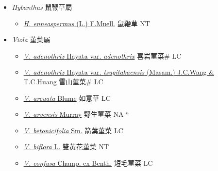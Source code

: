 
  \begin{itemize}
 \item[] \textit{Hybanthus} 鼠鞭草屬
                    
  \begin{itemize}
        \item[] \href{http://www.theplantlist.org/tpl1.1/search?q=Hybanthus+enneaspermus}{\textit{H. enneaspermus} (L.) F.Muell.}   鼠鞭草 NT
  \end{itemize}
 \item[] \textit{Viola} 菫菜屬
                    
  \begin{itemize}
        \item[] \href{http://www.theplantlist.org/tpl1.1/search?q=Viola+adenothrix+var.+adenothrix}{\textit{V. adenothrix} Hayata var. \textit{adenothrix}}   喜岩菫菜\# LC
        \item[] \href{http://www.theplantlist.org/tpl1.1/search?q=Viola+adenothrix+var.+tsugitakaensis}{\textit{V. adenothrix} Hayata var. \textit{tsugitakaensis} (Masam.) J.C.Wang \& T.C.Huang}   雪山菫菜\# LC
        \item[] \href{http://www.theplantlist.org/tpl1.1/search?q=Viola+arcuata}{\textit{V. arcuata} Blume}   如意草 LC
        \item[] \href{http://www.theplantlist.org/tpl1.1/search?q=Viola+arvensis}{\textit{V. arvensis} Murray}   野生菫菜 NA $^n$
        \item[] \href{http://www.theplantlist.org/tpl1.1/search?q=Viola+betonicifolia}{\textit{V. betonicifolia} Sm.}   箭葉菫菜 LC
        \item[] \href{http://www.theplantlist.org/tpl1.1/search?q=Viola+biflora}{\textit{V. biflora} L.}   雙黃花菫菜 NT
        \item[] \href{http://www.theplantlist.org/tpl1.1/search?q=Viola+confusa}{\textit{V. confusa} Champ. ex Benth.}   短毛菫菜 LC

\end{itemize}
\end{itemize}
